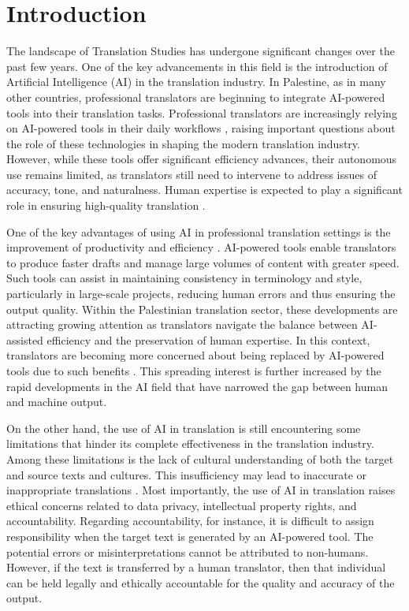\documentclass[english]{textolivre}
\begin{document}
\section{Introduction}\label{sec-intro}
The landscape of Translation Studies has undergone significant changes over the past few years. One of the key advancements in this field is the introduction of Artificial Intelligence (AI) in the translation industry. In Palestine, as in many other countries, professional translators are beginning to integrate AI-powered tools into their translation tasks. Professional translators are increasingly relying on AI-powered tools in their daily workflows \cite{OmarSalih2024Postediting}, raising important questions about the role of these technologies in shaping the modern translation industry. However, while these tools offer significant efficiency advances, their autonomous use remains limited, as translators still need to intervene to address issues of accuracy, tone, and naturalness. Human expertise is expected to play a significant role in ensuring high-quality translation \cite{AlKaabiEtAl2024CulturalConnotations,Shahmerdanova2025AITranslation}.

One of the key advantages of using AI in professional translation settings is the improvement of productivity and efficiency \cite{ShormaniAlSohbani2025TranslationIndustry}. AI-powered tools enable translators to produce faster drafts and manage large volumes of content with greater speed. Such tools can assist in maintaining consistency in terminology and style, particularly in large-scale projects, reducing human errors and thus ensuring the output quality. Within the Palestinian translation sector, these developments are attracting growing attention as translators navigate the balance between AI-assisted efficiency and the preservation of human expertise. In this context, translators are becoming more concerned about being replaced by AI-powered tools due to such benefits \cite{KirovMalamin2022TranslatorsAI,MoneusSahari2024LegalTranslation}. This spreading interest is further increased by the rapid developments in the AI field that have narrowed the gap between human and machine output.

On the other hand, the use of AI in translation is still encountering some limitations that hinder its complete effectiveness in the translation industry. Among these limitations is the lack of cultural understanding of both the target and source texts and cultures. This insufficiency may lead to inaccurate or inappropriate translations \cite{Shahmerdanova2025AITranslation}. Most importantly, the use of AI in translation raises ethical concerns related to data privacy, intellectual property rights, and accountability. Regarding accountability, for instance, it is difficult to assign responsibility when the target text is generated by an AI-powered tool. The potential errors or misinterpretations cannot be attributed to non-humans. However, if the text is transferred by a human translator, then that individual can be held legally and ethically accountable for the quality and accuracy of the output.
\end{document}
